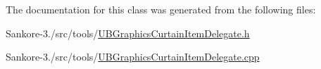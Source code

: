 The documentation for this class was generated from the following files\-:\begin{DoxyCompactItemize}
\item 
Sankore-\/3./src/tools/\hyperlink{_u_b_graphics_curtain_item_delegate_8h}{U\-B\-Graphics\-Curtain\-Item\-Delegate.\-h}\item 
Sankore-\/3./src/tools/\hyperlink{_u_b_graphics_curtain_item_delegate_8cpp}{U\-B\-Graphics\-Curtain\-Item\-Delegate.\-cpp}\end{DoxyCompactItemize}
